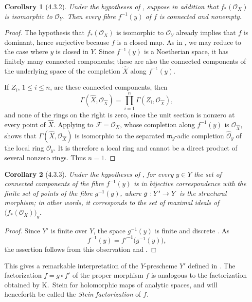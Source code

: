 \documentclass[oneside]{amsart}
\theoremstyle{ega-env-style}
\theoremstyle{ega-thm-env-style}
\newtheorem*{corollary}{Corollary}
\theoremstyle{ega-defn-env-style}
\def\mathcal{\mathscr}
\def\sh{\mathcal}                   %
\def\leq{\leqslant}                 %
\renewcommand{\to}{\mathchoice{\longrightarrow}{\rightarrow}{\rightarrow}{\rightarrow}}
\let\EGAOriginalLabel\label
\renewcommand{\label}[1]{\phantomsection\EGAOriginalLabel{#1}}
\begin{document}
\begin{corollary}[4.3.2]
\label{III.4.3.2}
Under the hypotheses of , suppose in addition that
$f_*(\sh{O}_X)$ is isomorphic to $\sh{O}_Y$.  Then every fibre
$f^{-1}(y)$ of $f$ is connected and nonempty.
\end{corollary}

\begin{proof}
The hypothesis that $f_*(\sh{O}_X)$ is isomorphic to $\sh{O}_Y$
already implies that $f$ is dominant, hence surjective because $f$
is a closed map.  As in , we may reduce to the case
where $y$ is closed in $Y$.  Since $f^{-1}(y)$ is a Noetherian
space, it has finitely many connected components; these are also the
connected components of the underlying space of the completion
$\widehat{X}$ along $f^{-1}(y)$.

If $Z_i$, $1\leq i\leq n$, are these connected components, then
\[
  \Gamma(\widehat{X},\sh{O}_{\widehat{X}})
  =
  \prod_{i=1}^{n}\Gamma(Z_i,\sh{O}_{\widehat{X}}),
\]
and none of the rings on the right is zero, since the unit section is
nonzero at every point of $\widehat{X}$.  Applying
 to $\sh{F}=\sh{O}_X$, whose completion along
$f^{-1}(y)$ is $\sh{O}_{\widehat{X}}$, shows that
$\Gamma(\widehat{X},\sh{O}_{\widehat{X}})$ is isomorphic to the
separated $\mathfrak{m}_y$-adic completion
$\widehat{\sh{O}}_y$ of the local ring $\sh{O}_y$.  It is therefore
a local ring and cannot be a direct product of several nonzero rings.
Thus $n=1$.
\end{proof}

\begin{corollary}[4.3.3]
\label{III.4.3.3}
Under the hypotheses of , for every $y\in Y$ the set
of connected components of the fibre $f^{-1}(y)$ is in bijective
correspondence with the finite set of points of the fibre
$g^{-1}(y)$, where $g:Y'\to Y$ is the structural morphism; in other
words, it corresponds to the set of maximal ideals of
$\bigl(f_*(\sh{O}_X)\bigr)_y$.
\end{corollary}

\begin{proof}
Since $Y'$ is finite over $Y$, the space $g^{-1}(y)$ is finite and
discrete .  As
\[
  f^{-1}(y)=f'^{-1}\bigl(g^{-1}(y)\bigr),
\]
the assertion follows from this observation and
.
\end{proof}

This gives a remarkable interpretation of the $Y$-prescheme $Y'$
defined in .  The factorization
$f=g\circ f'$ of the proper morphism $f$ is analogous to the
factorization obtained by K.~Stein for holomorphic maps of analytic
spaces, and will henceforth be called the \emph{Stein factorization}
of $f$.
\end{document}
